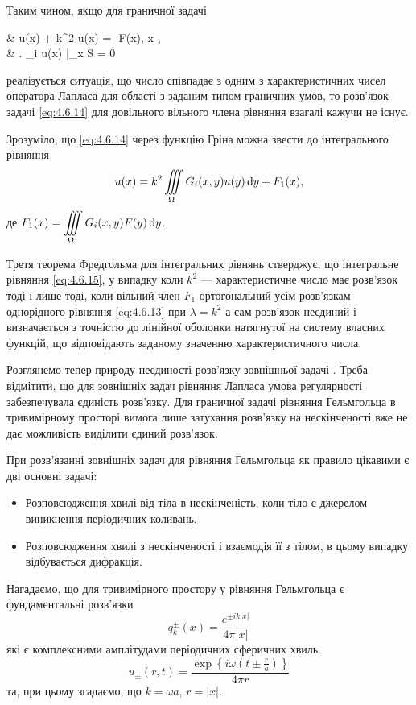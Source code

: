 Таким чином, якщо для граничної задачі
\begin{system}
	\label{eq:4.6.14}
	& \Delta u(x) + k^2 u(x) = -F(x), \quad x \in \Omega, \\
	& \left. \ell_i u(x) \right|_{x \in S} = 0
\end{system}
реалізується ситуація, що число   співпадає з одним з характеристичних чисел оператора Лапласа для області   з заданим типом граничних умов, то розв'язок задачі \eqref{eq:4.6.14} для довільного вільного члена рівняння взагалі кажучи не існує. \medskip

Зрозуміло, що \eqref{eq:4.6.14} через функцію Гріна  можна звести до інтегрального рівняння
\begin{equation}
	\label{eq:4.6.15}
	u(x) = k^2 \displaystyle\iiint\limits_\Omega G_i(x, y) u(y) \mathop{}\!\mathrm{d} y + F_1(x),
\end{equation}
де $F_1(x) = \displaystyle\iiint\limits_\Omega G_i(x, y) F(y) \mathop{}\!\mathrm{d} y$. \medskip

Третя теорема Фредгольма для інтегральних рівнянь стверджує, що інтегральне рівняння \eqref{eq:4.6.15}, у випадку коли $k^2$ --- характеристичне число має розв'язок тоді і лише тоді, коли вільний член $F_1$ ортогональний усім розв'язкам однорідного рівняння \eqref{eq:4.6.13} при $\lambda = k^2$ а сам розв'язок неєдиний і визначається з точністю до лінійної оболонки натягнутої на систему власних функцій, що відповідають заданому значенню характеристичного числа. \medskip

Розглянемо тепер природу неєдиності розв'язку зовнішньої задачі . Треба відмітити, що для зовнішніх задач рівняння Лапласа умова регулярності забезпечувала єдиність розв'язку. Для граничної задачі рівняння Гельмгольца в тривимірному просторі вимога лише затухання розв'язку на нескінченості вже не дає можливість виділити єдиний розв'язок. \medskip

При розв'язанні зовнішніх задач для рівняння Гельмгольца як правило цікавими є дві основні задачі:
\begin{itemize}
	\item Розповсюдження хвилі від тіла в нескінченість, коли тіло є джерелом виникнення періодичних коливань.
	\item Розповсюдження хвилі з нескінченості і взаємодія її з тілом, в цьому випадку відбувається дифракція.
\end{itemize}

Нагадаємо, що для тривимірного простору у рівняння Гельмгольца є фундаментальні розв'язки 
\begin{equation}
	\label{eq:4.6.16}
	q_k^\pm(x) = \frac{e^{\pm i k |x|}}{4 \pi |x|}
\end{equation}
які є комплексними амплітудами періодичних сферичних хвиль
\begin{equation}
	\label{eq:4.6.17}
	u_\pm(r, t) = \frac{\exp\left\{i \omega \left( t \pm \frac{r}{a} \right)\right\}}{4 \pi r}
\end{equation}
та, при цьому згадаємо, що $k = \omega  a$, $r = |x|$. \medskip

